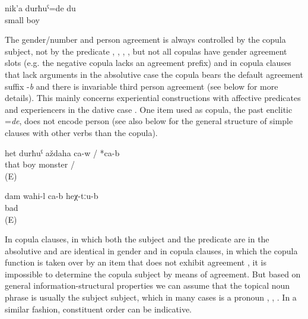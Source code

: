 \begin{exe}
	\ex	\label{ex:‎I was a little boy@A}
	\gll	nik'a	durħuˁ=de	du\\
		small	boy	\\
	\glt	{}
\end{exe}

The gender/number and person agreement is always controlled by the copula subject, not by the predicate , ,  ,  , but not all copulas have gender agreement slots (e.g. the negative copula lacks an agreement prefix) and in copula clauses that lack arguments in the absolutive case the copula bears the default agreement suffix -\textit{b} and there is invariable third person agreement (see  below for more details). This mainly concerns experiential constructions with affective predicates and experiencers in the dative case . One item used as copula, the past enclitic =\textit{de}, does not encode person  (see also  below for the general structure of simple clauses with other verbs than the copula).

\begin{exe}
	\ex	\label{ex:‎‎‎That boy is a monster}
	\gll	het	durħuˁ	aždaha	ca-w	/ *ca-b\\
		that	boy	monster		/ \\
	\glt	{} (E)
	
	\ex	\label{ex:I feel(s) bad there}
	\gll	dam	wahi-l	ca-b	heχ-tːu-b\\
			bad		\\
	\glt	{} (E)	
	
\end{exe}


In copula clauses, in which both the subject and the predicate are in the absolutive and are identical in gender  and in copula clauses, in which the copula function is taken over by an item that does not exhibit agreement , it is impossible to determine the copula subject by means of agreement. But based on general information-structural properties we can assume that the topical noun phrase is usually the subject subject, which in many cases is a pronoun , , . In a similar fashion, constituent order can be indicative. 

